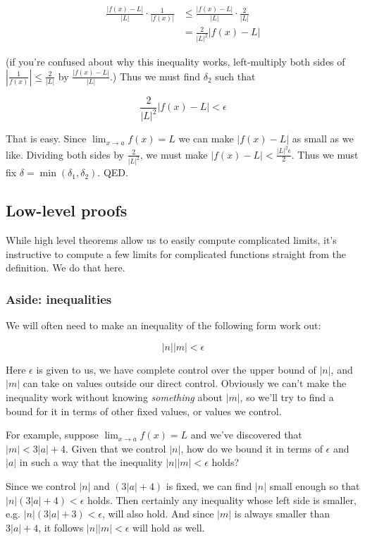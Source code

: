 \begin{align*}
  \frac{|f(x)-L|}{|L|}\cdot\frac{1}{|f(x)|}&\leq\frac{|f(x)-L|}{|L|}\cdot\frac{2}{|L|}\\
                                       &=\frac{2}{|L|^2}|f(x)-L|
\end{align*}

(if you're confused about why this inequality works, left-multiply both sides of
$|\frac{1}{f(x)}|\leq \frac{2}{|L|}$ by $\frac{|f(x)-L|}{|L|}$.) Thus we
must find $\delta_2$ such that

\[\frac{2}{|L|^2}|f(x)-L|<\epsilon\]

That is easy. Since $\lim_{x\to a}f(x)=L$ we can make $|f(x)-L|$ as
small as we like. Dividing both sides by $\frac{2}{|L|^2}$, we must
make $|f(x)-L|<\frac{|L|^2\epsilon}{2}$. Thus we must fix
$\delta=\min(\delta_1, \delta_2)$. QED.

\subsection{Low-level proofs}

While high level theorems allow us to easily compute complicated
limits, it's instructive to compute a few limits for complicated
functions straight from the definition. We do that here.

\subsubsection*{Aside: inequalities}

We will often need to make an inequality of the following form work out:

\[|n||m|<\epsilon\]

Here $\epsilon$ is given to us, we have complete control over the upper bound
of $|n|$, and $|m|$ can take on values outside our direct control.
Obviously we can't make the inequality work without knowing
\textit{something} about $|m|$, so we'll try to find a bound for it in
terms of other fixed values, or values we control.

\vs

For example, suppose $\lim_{x\to a}f(x)=L$ and we've discovered that
$|m|<3|a|+4$. Given that we control $|n|$, how do we bound it in terms
of $\epsilon$ and $|a|$ in such a way that the inequality $|n||m|<\epsilon$ holds?

\vs

Since we control $|n|$ and $(3|a|+4)$ is fixed, we can find $|n|$
small enough so that $|n|(3|a|+4)<\epsilon$ holds. Then certainly any
inequality whose left side is smaller, e.g. $|n|(3|a|+3)<\epsilon$, will also
hold. And since $|m|$ is always smaller than $3|a|+4$, it follows
$|n||m|<\epsilon$ will hold as well.

